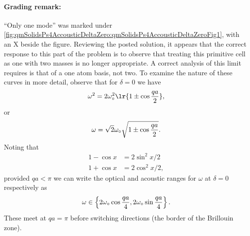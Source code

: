 {\paragraph{Grading remark:} ``Only one mode'' was marked under \cref{fig:qmSolidsPs4AccousticDeltaZero:qmSolidsPs4AccousticDeltaZeroFig1}, with an X beside the figure.  Reviewing the posted solution, it appears that the correct response to this part of the problem is to observe that treating this primitive cell as one with two masses is no longer appropriate.  A correct analysis of this limit requires is that of a one atom basis, not two.
%
To examine the nature of these curves in more detail, observe that for \(\delta = 0\) we have
%
\begin{equation}\label{eqn:condensedMatterProblemSet4Problem2:820}
\omega^2 = 2 \omega_\nought^2 \lr{ 1 \pm \cos \frac{qa}{2} },
\end{equation}
%
or
\begin{equation}\label{eqn:condensedMatterProblemSet4Problem2:840}
\omega = \sqrt{2} \omega_\circ \sqrt{ 1 \pm \cos \frac{qa}{2} }.
\end{equation}
%
Noting that
\begin{equation}\label{eqn:condensedMatterProblemSet4Problem2:860}
\begin{aligned}
1 - \cos x &= 2 \sin^2 x/2 \\
1 + \cos x &= 2 \cos^2 x/2,
\end{aligned}
\end{equation}
%
provided \(qa < \pi\) we can write the optical and acoustic ranges for \(\omega\) at \(\delta = 0\) respectively as
%
\begin{dmath}\label{eqn:condensedMatterProblemSet4Problem2:880}
\omega \in \left\{
2 \omega_\nought \cos \frac{qa}{4},
2 \omega_\nought \sin \frac{qa}{4}
 \right\}.
\end{dmath}
%
These meet at \(qa = \pi\) before switching directions (the border of the Brillouin zone).
}
